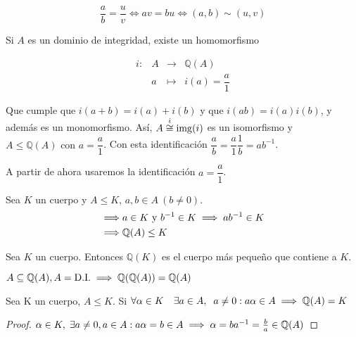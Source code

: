 \begin{ncor}
	\[\frac{a}{b}= \frac{u}{v} \iff av = bu \iff (a,b) \sim (u,v)\]
\end{ncor}

\begin{nprop}
  Si $A$ es un dominio de integridad, existe un homomorfismo

  \[
  \begin{array}{llll}
    i :& A & \longrightarrow & \mathbb{Q}(A) \\
       &a & \longmapsto &  i(a) = \dfrac{a}{1}
  \end{array}
  \]

  Que cumple que $i(a+b) = i(a)+i(b)$ y que $i(ab)=i(a)i(b)$, y además es un monomorfismo.
  Así, $A \stackrel{i}{\cong} \operatorname*{img}(i)$ es un isomorfismo y $A\le\mathbb{Q}(A) \text{ con } a=\dfrac{a}{1}$.
  Con esta identificación $\dfrac{a}{b} = \dfrac{a}{1}\dfrac{1}{b} = ab^{-1}$.
\end{nprop}

A partir de ahora usaremos la identificación $a = \dfrac{a}{1}$.

\begin{nprop}
  Sea $K$ un cuerpo y $A\le K$, $a,b\in A\ (b\not=0)$.
  \begin{align}
    \implies& a\in K \text{ y } b^{-1}\in K \implies ab^{-1}\in K\notag\\
    \implies&\mathbb{Q}(A)\le K\notag
  \end{align}
\end{nprop}

\begin{nota}
 Sea $K$ un cuerpo. Entonces  $\mathbb{Q}(K)$ es el cuerpo más pequeño que contiene a $K$.
\end{nota}

\begin{nota}
  $A \subseteq \mathbb{Q}(A), A=\text{D.I.} \implies \mathbb{Q}(\mathbb{Q}(A)) = \mathbb{Q}(A)$
\end{nota}


\begin{nprop}
  Sea K un cuerpo, $A\le K$. Si $\forall\alpha\in K\quad \exists a\in A,\;\; a \not= 0 : a\alpha\in A \implies \mathbb{Q}(A)=K$
\end{nprop}

\begin{proof}
  $\alpha\in K,\; \exists a \ne 0, a\in A : a\alpha=b\in A \implies \alpha = ba^{-1} = \frac{b}{a}\in \mathbb{Q}(A)$
\end{proof}

